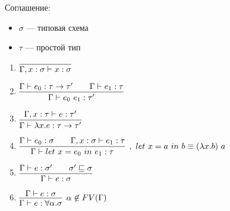 Соглашение:
\begin{itemize}
    \item $\sigma$ --- типовая схема
    \item $\tau$ --- простой тип
\end{itemize}


\begin{enumerate}
    \item $\vcenter{\infer{\Gamma, x : \sigma \vdash x : \sigma}{}}$
    \item $\vcenter{\infer{\Gamma \vdash e_0\ e_1 : \tau'}{\Gamma \vdash e_0 : \tau \rightarrow \tau' \qquad \Gamma \vdash e_1 : \tau}}$
    \item $\vcenter{\infer{\Gamma \vdash \lambda x.e : \tau \rightarrow \tau'}{\Gamma, x : \tau \vdash e : \tau'}}$
    \item $\vcenter{\infer[,\ let\ x = a\ in\ b \equiv (\lambda x.b)\ a]{\Gamma \vdash let\ x = e_0\ in\ e_1 : \tau}{\Gamma \vdash e_0 : \sigma \qquad \Gamma, x : \sigma \vdash e_1 : \tau}}$ 
    \item $\vcenter{\infer{\Gamma \vdash e : \sigma}{\Gamma \vdash e : \sigma' \qquad  \sigma' \sqsubseteq \sigma}}$
    \item $\vcenter{\infer[\alpha \not \in FV(\Gamma)]{\Gamma \vdash e : \forall \alpha.\sigma}{\Gamma \vdash e : \sigma}}$
\end{enumerate}



